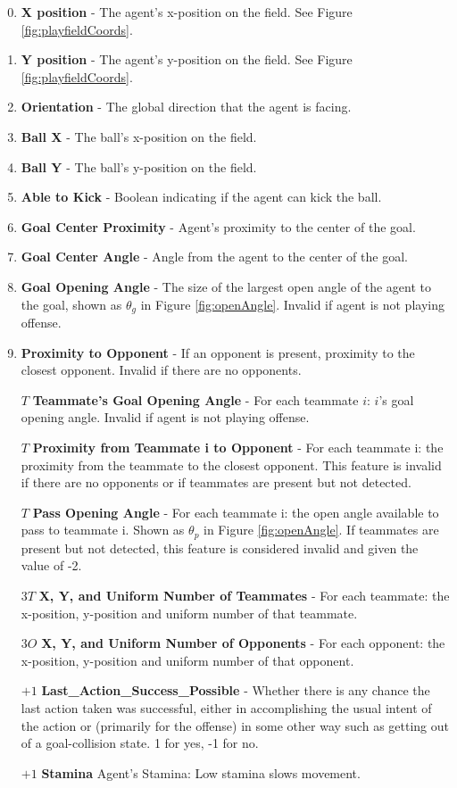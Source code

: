 \documentclass[12pt]{article}
\begin{document}
\begin{enumerate}[noitemsep]
\setcounter{enumi}{-1}
\item{\textbf{X position} - The agent’s x-position on the field. See
  Figure \ref{fig:playfieldCoords}.}
\item{\textbf{Y position} - The agent’s y-position on the field. See
  Figure \ref{fig:playfieldCoords}.}
\item{\textbf{Orientation} - The global direction that the agent is facing.}
\item{\textbf{Ball X} - The ball's x-position on the field.}
\item{\textbf{Ball Y} - The ball's y-position on the field.}
\item{\textbf{Able to Kick} - Boolean indicating if the agent can kick the ball.}
\item{\textbf{Goal Center Proximity} - Agent's proximity to the center of the goal.}
\item{\textbf{Goal Center Angle} - Angle from the agent to the center of the goal.}
\item{\textbf{Goal Opening Angle} - The size of the largest open angle
  of the agent to the goal, shown as $\theta_g$ in Figure
  \ref{fig:openAngle}. Invalid if agent is not playing offense.}
\item{\textbf{Proximity to Opponent} - If an opponent is present,
  proximity to the closest opponent. Invalid if there are no
  opponents.}
\item [$T$] {\textbf{Teammate's Goal Opening Angle} - For each
  teammate $i$: $i$’s goal opening angle. Invalid if agent is not
  playing offense.}
\item [$T$] {\textbf{Proximity from Teammate i to Opponent} - For each
  teammate i: the proximity from the teammate to the closest
  opponent. This feature is invalid if there are no opponents or if
  teammates are present but not detected.}
\item [$T$] {\textbf{Pass Opening Angle} - For each teammate i: the open
  angle available to pass to teammate i. Shown as $\theta_p$ in Figure
  \ref{fig:openAngle}. If teammates are present but not detected, this
  feature is considered invalid and given the value of -2.}
\item [$3T$] {\textbf{X, Y, and Uniform Number of
    Teammates} - For each teammate: the x-position, y-position and
  uniform number of that teammate.}
\item [$3O$] {\textbf{X, Y, and Uniform Number of
    Opponents} - For each opponent: the x-position, y-position and
  uniform number of that opponent.}
\item [$+1$] {\textbf{Last\_Action\_Success\_Possible} - Whether there is any chance
	the last action taken was successful, either in accomplishing the
	usual intent of the action or (primarily for the offense) in some other way such as
	getting out of a goal-collision state. 1 for yes, -1 for no.}
\item [$+1$] {\textbf{Stamina} Agent's Stamina: Low stamina slows movement.}
\end{enumerate}
\end{document}
